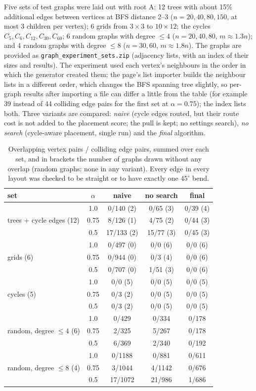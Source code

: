 \documentclass[11pt,a4paper]{article}
\begin{document}
Five sets of test graphs were laid out with root A: 12 trees with about 15\% additional edges between vertices at BFS distance 2--3 ($n=20,40,80,150$, at most 3 children per vertex); 6 grids from $3\times3$ to $10\times12$; the cycles $C_5,C_6,C_{12},C_{30},C_{60}$; 6 random graphs with degree $\le4$ ($n=20,40,80$, $m\approx1.3n$); and 4 random graphs with degree $\le8$ ($n=30,60$, $m\approx1.8n$). The graphs are provided as \texttt{graph\_experiment\_sets.zip} (adjacency lists, with an index of their sizes and results). The experiment used each vertex's neighbours in the order in which the generator created them; the page's list importer builds the neighbour lists in a different order, which changes the BFS spanning tree slightly, so per-graph results after importing a file can differ a little from the table (for example 39 instead of 44 colliding edge pairs for the first set at $\alpha=0.75$); the index lists both. Three variants are compared: \emph{naive} (cycle edges routed, but their route cost is not added to the placement score; the pull is kept; no settings search), \emph{no search} (cycle-aware placement, single run) and the \emph{final} algorithm.

\begin{table}[H]
\centering\footnotesize
\setlength{\tabcolsep}{4pt}
\begin{tabular}{@{}l c ccc@{}}
\toprule
set & $\alpha$ & naive & no search & final\\
\midrule
\multirow{3}{*}{trees + cycle edges (12)} & 1.0 & 0/140 (2) & 0/65 (3) & 0/39 (4)\\
 & 0.75 & 8/126 (1) & 4/75 (2) & 0/44 (3)\\
 & 0.5 & 17/133 (2) & 15/77 (3) & 0/45 (3)\\
\midrule
\multirow{3}{*}{grids (6)} & 1.0 & 0/497 (0) & 0/0 (6) & 0/0 (6)\\
 & 0.75 & 0/944 (0) & 0/3 (4) & 0/0 (6)\\
 & 0.5 & 0/707 (0) & 1/51 (3) & 0/0 (6)\\
\midrule
\multirow{3}{*}{cycles (5)} & 1.0 & 0/0 (5) & 0/0 (5) & 0/0 (5)\\
 & 0.75 & 0/3 (2) & 0/0 (5) & 0/0 (5)\\
 & 0.5 & 0/3 (2) & 0/0 (5) & 0/0 (5)\\
\midrule
\multirow{3}{*}{random, degree $\le 4$ (6)} & 1.0 & 0/429 & 0/334 & 0/178\\
 & 0.75 & 2/325 & 5/267 & 0/178\\
 & 0.5 & 6/369 & 2/340 & 0/192\\
\midrule
\multirow{3}{*}{random, degree $\le 8$ (4)} & 1.0 & 0/1188 & 0/881 & 0/611\\
 & 0.75 & 3/1044 & 4/1142 & 0/676\\
 & 0.5 & 17/1072 & 21/986 & 1/686\\
\bottomrule
\end{tabular}
\caption{Overlapping vertex pairs / colliding edge pairs, summed over each set, and in brackets the number of graphs drawn without any overlap (random graphs: none in any variant). Every edge in every layout was checked to be straight or to have exactly one $45^\circ$ bend.}
\label{tab:exp}
\end{table}
\end{document}
